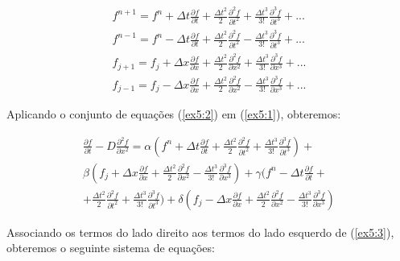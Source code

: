 \documentclass[11pt]{article}
\begin{document}
\begin{equation}
\begin{aligned}
    f^{n+1} = f^{n} + \Delta{t}\frac{\partial{f}}{\partial{t}} + \frac{\Delta{t}^2}{2}\frac{\partial^2{f}}{\partial{t^2}} + \frac{\Delta{t}^3}{3!}\frac{\partial^3{f}}{\partial{t^3}} + ...
    \\
    f^{n-1} = f^{n} - \Delta{t}\frac{\partial{f}}{\partial{t}} + \frac{\Delta{t}^2}{2}\frac{\partial^2{f}}{\partial{t^2}} - \frac{\Delta{t}^3}{3!}\frac{\partial^3{f}}{\partial{t^3}} + ...
    \\
    f_{j+1} = f_{j} + \Delta{x}\frac{\partial{f}}{\partial{x}} + \frac{\Delta{t}^2}{2}\frac{\partial^2{f}}{\partial{x^2}} + \frac{\Delta{t}^3}{3!}\frac{\partial^3{f}}{\partial{x^3}} + ...
    \\
    f_{j-1} = f_{j} - \Delta{x}\frac{\partial{f}}{\partial{x}} + \frac{\Delta{t}^2}{2}\frac{\partial^2{f}}{\partial{x^2}} - \frac{\Delta{t}^3}{3!}\frac{\partial^3{f}}{\partial{x^3}} + ...
\end{aligned}
    \label{ex5:2}
\end{equation}

Aplicando o conjunto de equações (\ref{ex5:2}) em (\ref{ex5:1}),
obteremos:

\begin{equation}
\begin{aligned}
    \frac{\partial{f}}{\partial{t}} - D\frac{\partial^2{f}}{\partial{x^2}} =
    \alpha (f^{n} + \Delta{t}\frac{\partial{f}}{\partial{t}} + \frac{\Delta{t}^2}{2}\frac{\partial^2{f}}{\partial{t^2}}+ \frac{\Delta{t}^3}{3!}\frac{\partial^3{f}}{\partial{t^3}}) +  \\
    \beta (f_{j} + \Delta{x}\frac{\partial{f}}{\partial{x}} + \frac{\Delta{t}^2}{2}\frac{\partial^2{f}}{\partial{x^2}}- \frac{\Delta{t}^3}{3!}\frac{\partial^3{f}}{\partial{x^3}}) +
    \gamma (f^{n} - \Delta{t}\frac{\partial{f}}{\partial{t}} + \\ + \frac{\Delta{t}^2}{2}\frac{\partial^2{f}}{\partial{t^2}}+ \frac{\Delta{t}^3}{3!}\frac{\partial^3{f}}{\partial{t^3}}) +
    \delta (f_{j} - \Delta{x}\frac{\partial{f}}{\partial{x}} + \frac{\Delta{t}^2}{2}\frac{\partial^2{f}}{\partial{x^2}}- \frac{\Delta{t}^3}{3!}\frac{\partial^3{f}}{\partial{x^3}})
\end{aligned}
    \label{ex5:3}
\end{equation}

Associando os termos do lado direito aos termos do lado esquerdo de
(\ref{ex5:3}), obteremos o seguinte sistema de equações:
\end{document}
